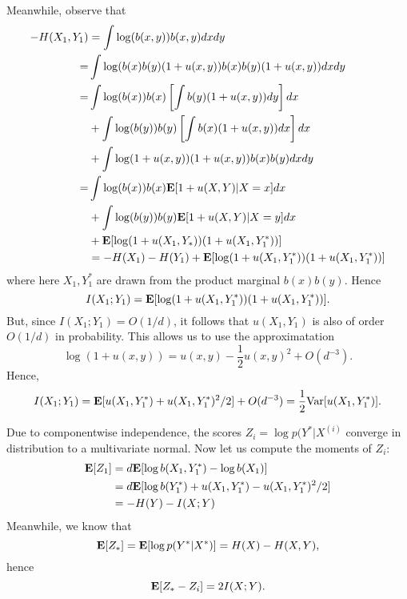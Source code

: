 \documentclass[12pt]{article}
\begin{document}
Meanwhile, observe that
\begin{align*}
-H(X_1, Y_1) &= \int \log(b(x, y)) b(x,y) dx dy
\\=& \int \log (b(x)b(y)(1 + u(x, y)) b(x) b(y) (1 + u(x, y)) dx dy
\\=& \int \log(b(x)) b(x) \left[\int b(y) (1 + u(x, y)) dy\right]dx 
\\&+ \int \log(b(y)) b(y) \left[\int b(x) (1 + u(x, y)) dx\right]dx 
\\&+ \int \log(1 + u(x, y)) (1 + u(x, y)) b(x) b(y) dx dy
\\=& \int \log(b(x)) b(x) \textbf{E}[1 + u(X, Y)|X = x] dx 
\\&+ \int \log(b(y)) b(y) \textbf{E}[1 + u(X, Y)|X = y] dx 
\\&+ \textbf{E}[\log(1 + u(X_1, Y_*))(1 + u(X_1, Y_1^*))]
\\&= -H(X_1) - H(Y_1) + \textbf{E}[\log(1 + u(X_1, Y_1^*))(1 + u(X_1, Y_1^*))]
\end{align*}
where here $X_1, Y_1^*$ are drawn from the product marginal $b(x)b(y)$.
Hence
\[
I(X_1; Y_1) = \textbf{E}[\log(1 + u(X_1, Y_1^*))(1 + u(X_1, Y_1^*))].
\]
But, since $I(X_1; Y_1) = O(1/d)$, it follows that $u(X_1, Y_1)$ is
also of order $O(1/d)$ in probability.
This allows us to use the approximatation
\[
\log(1 + u(x, y)) = u(x, y) - \frac{1}{2}u(x,y)^2 + O(d^{-3}).
\]
Hence,
\[
I(X_1; Y_1) = \textbf{E}[u(X_1, Y_1^*) + u(X_1, Y_1^*)^2/2] + O(d^{-3}) = \frac{1}{2}\text{Var}[u(X_1,Y_1^*)].
\]

Due to componentwise independence, the scores $Z_i = \log p(Y^*|X^{(i)}$ converge in distribution to a multivariate normal.
Now let us compute the moments of $Z_i$:
\begin{align*}
\textbf{E}[Z_1] &= d\textbf{E}[\log b(X_1, Y_1^*) - \log b(X_1)]
\\&= d \textbf{E}[\log b(Y_1^*) + u(X_1,Y_1^*) - u(X_1, Y_1^*)^2/2]
\\&= -H(Y) - I(X; Y)
\end{align*}
Meanwhile, we know that
\[
\textbf{E}[Z_*] = \textbf{E}[\log p(Y^*|X^*)] = H(X) - H(X, Y),
\]
hence
\[
\textbf{E}[Z_* - Z_i] = 2 I(X; Y).
\]
\end{document}
